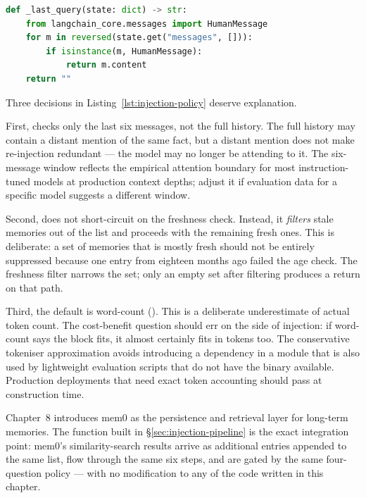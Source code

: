 \begin{lstlisting}[language=Python,
  caption={Four policy helpers and should\_inject\_memory gate},
  label={lst:injection-policy}]
def _last_query(state: dict) -> str:
    from langchain_core.messages import HumanMessage
    for m in reversed(state.get("messages", [])):
        if isinstance(m, HumanMessage):
            return m.content
    return ""
\end{lstlisting}

Three decisions in Listing~\ref{lst:injection-policy} deserve
explanation.

First,  checks only the last six
messages, not the full history. The full history may contain a distant
mention of the same fact, but a distant mention does not make
re-injection redundant --- the model may no longer be attending to it.
The six-message window reflects the empirical attention boundary for
most instruction-tuned models at production context depths; adjust it if
evaluation data for a specific model suggests a different window.

Second,  does not short-circuit on the
freshness check. Instead, it \emph{filters} stale memories out of the
list and proceeds with the remaining fresh ones. This is deliberate:
a set of memories that is mostly fresh should not be entirely suppressed
because one  entry from eighteen months ago failed the
age check. The freshness filter narrows the set; only an empty set after
filtering produces a  return on that path.

Third, the default  is word-count
(). This is a deliberate underestimate of actual
token count. The cost-benefit question should err on the side of
injection: if word-count says the block fits, it almost certainly fits
in tokens too. The conservative tokeniser approximation avoids
introducing a  dependency in a module that is also used
by lightweight evaluation scripts that do not have the binary available.
Production deployments that need exact token accounting should pass
 at
construction time.

Chapter~8 introduces mem0 as the persistence and retrieval layer for
long-term memories. The  function built
in \S\ref{sec:injection-pipeline} is the exact integration point: mem0's
similarity-search results arrive as additional 
entries appended to the same list, flow through the same six steps, and
are gated by the same four-question policy --- with no modification to
any of the code written in this chapter.
